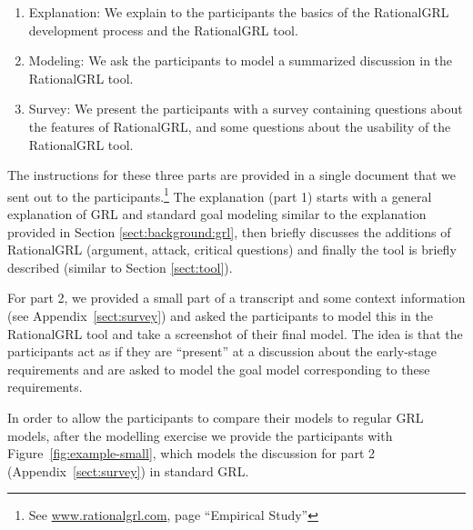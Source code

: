 \begin{enumerate}
\item Explanation: We explain to the participants the basics of the RationalGRL development process and the RationalGRL tool.
\item Modeling: We ask the participants to model a summarized discussion in the RationalGRL tool.
\item Survey: We present the participants with a survey containing questions about the features of RationalGRL, and some questions about the usability of the RationalGRL tool.
\end{enumerate}

The instructions for these three parts are provided in a single document that we sent out to the participants.\footnote{See \url{www.rationalgrl.com}, page ``Empirical Study''} The explanation (part 1) starts with a general explanation of GRL and standard goal modeling similar to the explanation provided in Section \ref{sect:background:grl}, then briefly discusses the additions of RationalGRL (argument, attack, critical questions) and finally the tool is briefly described (similar to Section \ref{sect:tool}). 

For part 2, we provided a small part of a transcript and some context information (see Appendix~\ref{sect:survey}) and asked the participants to model this in the RationalGRL tool and take a screenshot of their final model. The idea is that the participants act as if they are ``present'' at a discussion about the early-stage requirements and are asked to model the goal model corresponding to these requirements. 

In order to allow the participants to compare their models to regular GRL models, after the modelling exercise we provide the participants with Figure~\ref{fig:example-small}, which models the discussion for part 2 (Appendix~\ref{sect:survey}) in standard GRL.


